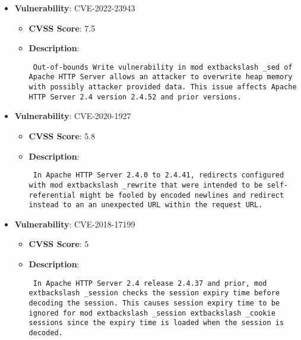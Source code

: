 \documentclass{article}
\begin{document}
\begin{itemize}
        \item \textbf{Vulnerability}: CVE-2022-23943
        \begin{itemize}
            \item \textbf{CVSS Score}:  7.5 
            \item \textbf{Description}: \parbox{\linewidth}{\texttt{ Out-of-bounds Write vulnerability in mod	extbackslash _sed of Apache HTTP Server allows an attacker to overwrite heap memory with possibly attacker provided data. This issue affects Apache HTTP Server 2.4 version 2.4.52 and prior versions. }}
        \end{itemize}
    
        \item \textbf{Vulnerability}: CVE-2020-1927
        \begin{itemize}
            \item \textbf{CVSS Score}:  5.8 
            \item \textbf{Description}: \parbox{\linewidth}{\texttt{ In Apache HTTP Server 2.4.0 to 2.4.41, redirects configured with mod	extbackslash _rewrite that were intended to be self-referential might be fooled by encoded newlines and redirect instead to an an unexpected URL within the request URL. }}
        \end{itemize}
    
        \item \textbf{Vulnerability}: CVE-2018-17199
        \begin{itemize}
            \item \textbf{CVSS Score}:  5 
            \item \textbf{Description}: \parbox{\linewidth}{\texttt{ In Apache HTTP Server 2.4 release 2.4.37 and prior, mod	extbackslash _session checks the session expiry time before decoding the session. This causes session expiry time to be ignored for mod	extbackslash _session	extbackslash _cookie sessions since the expiry time is loaded when the session is decoded. }}
        \end{itemize}
    

\end{itemize}
\end{document}
